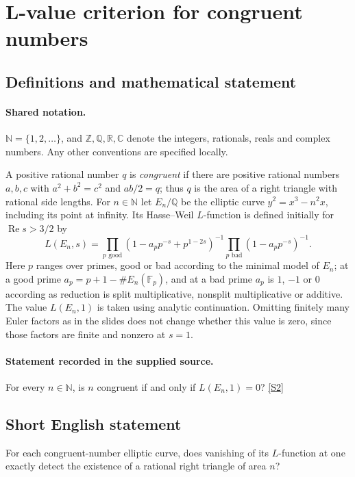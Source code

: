 \documentclass[11pt]{article}
\newcommand{\sref}[2]{\hyperlink{source:#1:#2}{[S#2]}}
\begin{document}
\section{L-value criterion for congruent numbers}\label{statement}

\subsection{Definitions and mathematical statement}

\paragraph{Shared notation.}$\mathbb N=\{1,2,\ldots\}$, and $\mathbb Z,\mathbb Q,\mathbb R,\mathbb C$ denote the integers, rationals, reals and complex numbers. Any other conventions are specified locally.


A positive rational number $q$ is \emph{congruent} if there are positive rational numbers $a,b,c$ with $a^2+b^2=c^2$ and $ab/2=q$; thus $q$ is the area of a right triangle with rational side lengths.
For $n\in\mathbb N$ let $E_n/\mathbb Q$ be the elliptic curve $y^2=x^3-n^2x$, including its point at infinity. Its Hasse--Weil $L$-function is defined initially for $\operatorname{Re}s>3/2$ by
\[
L(E_n,s)=\prod_{p\text{ good}}(1-a_pp^{-s}+p^{1-2s})^{-1}
\prod_{p\text{ bad}}(1-a_pp^{-s})^{-1}.
\]
Here $p$ ranges over primes, good or bad according to the minimal model of $E_n$; at a good prime $a_p=p+1-\#E_n(\mathbb F_p)$, and at a bad prime $a_p$ is $1$, $-1$ or $0$ according as reduction is split multiplicative, nonsplit multiplicative or additive. The value $L(E_n,1)$ is taken using analytic continuation. Omitting finitely many Euler factors as in the slides does not change whether this value is zero, since those factors are finite and nonzero at $s=1$.
\paragraph{Statement recorded in the supplied source.}
For every $n\in\mathbb N$, is $n$ congruent if and only if $L(E_n,1)=0$? \sref{statement}{2}
\subsection{Short English statement}
For each congruent-number elliptic curve, does vanishing of its $L$-function at one exactly detect the existence of a rational right triangle of area $n$?
\end{document}
